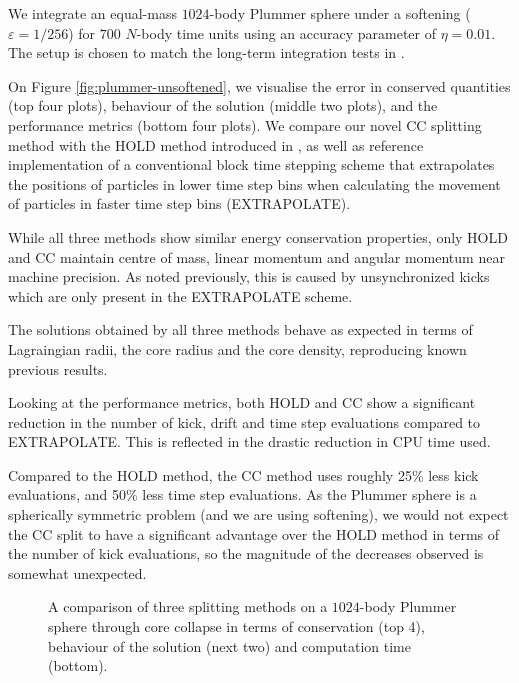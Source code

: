 \documentclass[referee]{aa}
\begin{document}
We integrate an equal-mass $1024$-body Plummer sphere under a softening
($\varepsilon=1/256$) for $700$ $N$-body time units using an accuracy
parameter of $\eta=0.01$. The setup is chosen to match the long-term
integration tests in \cite[their section 3.2]{Nitadori:2008gt}.

On Figure \ref{fig:plummer-unsoftened}, we visualise the error in
conserved quantities (top four plots), behaviour of the solution (middle
two plots), and the performance metrics (bottom four plots). We compare
our novel CC splitting method with the HOLD method introduced in \cite{Pelupessy:2012if},
as well as reference implementation of a conventional block time stepping
scheme that extrapolates the positions of particles in lower time
step bins when calculating the movement of particles in faster time
step bins (EXTRAPOLATE).

While all three methods show similar energy conservation properties,
only HOLD and CC maintain centre of mass, linear momentum and angular
momentum near machine precision. As noted previously, this is caused
by unsynchronized kicks which are only present in the EXTRAPOLATE
scheme.\cite{Pelupessy:2012if} 

The solutions obtained by all three methods behave as expected in
terms of Lagraingian radii, the core radius and the core density,
reproducing known previous results.

Looking at the performance metrics, both HOLD and CC show a significant
reduction in the number of kick, drift and time step evaluations compared
to EXTRAPOLATE. This is reflected in the drastic reduction in CPU
time used.

Compared to the HOLD method, the CC method uses roughly 25\% less
kick evaluations, and 50\% less time step evaluations. As the Plummer
sphere is a spherically symmetric problem (and we are using softening),
we would not expect the CC split to have a significant advantage over
the HOLD method in terms of the number of kick evaluations, so the
magnitude of the decreases observed is somewhat unexpected.

\begin{figure}[p]
\begin{centering}
\par\end{centering}

\begin{centering}
\par\end{centering}

\begin{centering}
\par\end{centering}

\caption{\label{fig:plummer-core-collapse} A comparison of three splitting
methods on a $1024$-body Plummer sphere through core collapse in
terms of conservation (top 4), behaviour of the solution (next two)
and computation time (bottom).}
\end{figure}
\end{document}
